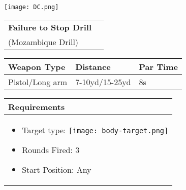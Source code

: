 \documentclass[../Cover.tex]{subfiles}
\begin{document}
	\begin{minipage}[t][0.2\textheight][t]{0.1\textwidth} 
		\texttt{[image: DC.png]}
	\end{minipage}
	\hfill
	\begin{minipage}[t][0.15\textheight][t]{0.8\textwidth}
		\begin{tabular}{ p{} l  }			
			\textbf{Failure to Stop Drill} \\
			\tiny (Mozambique Drill)\\[0.09\textheight]
		\end{tabular}
		\quad
		\begin{tabular}{ | p{} | p{} | p{} |}
			\hline
			\tiny Weapon Type & \tiny Distance & \tiny Par Time\\ 
			\hline
			\tiny Pistol/Long arm & \tiny 7-10yd/15-25yd & \tiny 8s \\ %
			\hline
		\end{tabular}
	\end{minipage}
	\begin{tabular}{p{}}
		\small Requirements \\
		\hline
		\tiny \begin{itemize}
			\item Target type: \texttt{[image: body-target.png]}
			\item Rounds Fired: 3
			\item Start Position: Any
		\end{itemize}				
		\\[0.6\textheight]
	\end{tabular}
\end{document}
